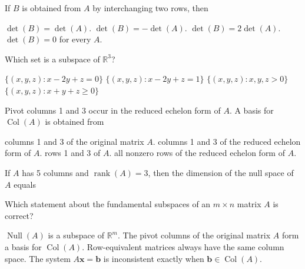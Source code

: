 \documentclass[12pt,a4paper,answers,addpoints]{exam}
\begin{document}
\begin{questions}
\question[2]
If $B$ is obtained from $A$ by interchanging two rows, then
\begin{choices}
    \choice $\det(B)=\det(A)$.
    \choice $\det(B)=-\det(A)$.
    \choice $\det(B)=2\det(A)$.
    \choice $\det(B)=0$ for every $A$.
\end{choices}

\question[2]
Which set is a subspace of $\mathbb R^3$?
\begin{choices}
    \choice $\{(x,y,z):x-2y+z=0\}$
    \choice $\{(x,y,z):x-2y+z=1\}$
    \choice $\{(x,y,z):x,y,z>0\}$
    \choice $\{(x,y,z):x+y+z\geq 0\}$
\end{choices}

\question[2]
Pivot columns 1 and 3 occur in the reduced echelon form of $A$. A basis for
$\operatorname{Col}(A)$ is obtained from
\begin{choices}
    \choice columns 1 and 3 of the original matrix $A$.
    \choice columns 1 and 3 of the reduced echelon form of $A$.
    \choice rows 1 and 3 of $A$.
    \choice all nonzero rows of the reduced echelon form of $A$.
\end{choices}

\question[2]
If $A$ has 5 columns and $\operatorname{rank}(A)=3$, then the dimension of the
null space of $A$ equals
\begin{choices}
\end{choices}

\newpage

\begingroup
\small

\question[2]
Which statement about the fundamental subspaces of an $m\times n$ matrix $A$ is correct?
\begin{choices}
    \choice $\operatorname{Null}(A)$ is a subspace of $\mathbb R^m$.
    \choice The pivot columns of the original matrix $A$ form a basis for
            $\operatorname{Col}(A)$.
    \choice Row-equivalent matrices always have the same column space.
    \choice The system $A\mathbf x=\mathbf b$ is inconsistent exactly when
            $\mathbf b\in\operatorname{Col}(A)$.
\end{choices}


\end{questions}
\end{document}
